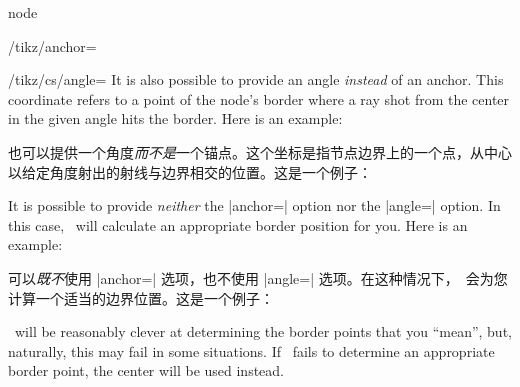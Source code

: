 \begin{coordinatesystem}{node}
\begin{key}{/tikz/anchor=}
\begin{codeexample}[preamble={\usetikzlibrary{arrows.meta}}]
\end{codeexample}
    \end{key}
    \begin{key}{/tikz/cs/angle=}
        It is also possible to provide an angle \emph{instead} of an anchor.
        This coordinate refers to a point of the node's border where a ray shot
        from the center in the given angle hits the border. Here is an example:
        
        也可以提供一个角度\emph{而不是}一个锚点。这个坐标是指节点边界上的一个点，从中心以给定角度射出的射线与边界相交的位置。这是一个例子：
        


\begin{codeexample}[preamble={\usetikzlibrary{shapes.geometric}}]
\end{codeexample}
    \end{key}

    It is possible to provide \emph{neither} the |anchor=| option nor the
    |angle=| option. In this case, \tikzname\ will calculate an appropriate
    border position for you. Here is an example:
    
    可以\emph{既不}使用 |anchor=| 选项，也不使用 |angle=| 选项。在这种情况下，\tikzname\ 会为您计算一个适当的边界位置。这是一个例子：
%
\begin{codeexample}[preamble={\usetikzlibrary{shapes.geometric}}]
\end{codeexample}

    \tikzname\ will be reasonably clever at determining the border points that
    you ``mean'', but, naturally, this may fail in some situations. If
    \tikzname\ fails to determine an appropriate border point, the center will
    be used instead.


\end{coordinatesystem}
